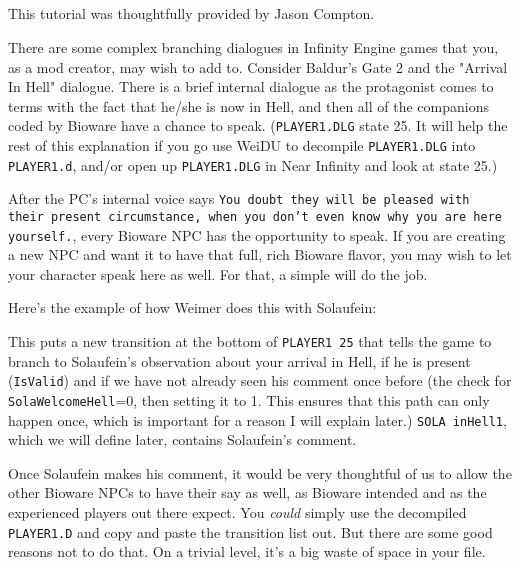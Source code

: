 \documentclass{article}
\def\ttref#1{\ahrefloc{#1}{\tt #1}}
\def\t#1{{\tt #1}}
\begin{document}
\subsection{\ttref{COPY!TRANS}}

This tutorial was thoughtfully provided by Jason Compton. 

There are some complex branching dialogues in Infinity Engine games that
you, as a mod creator, may wish to add to. Consider Baldur's Gate 2 and the
"Arrival In Hell" dialogue. There is a brief internal dialogue as the
protagonist comes to terms with the fact that he/she is now in Hell, and
then all of the companions coded by Bioware have a chance to speak.
(\t{PLAYER1.DLG} state 25. It will help the rest of this explanation if you
go use WeiDU to decompile \t{PLAYER1.DLG} into \t{PLAYER1.d}, and/or open
up \t{PLAYER1.DLG} in Near Infinity and look at state 25.)

After the PC's internal voice says \t{You doubt they will be pleased with
their present circumstance, when you don't even know why you are here
yourself.}, every Bioware NPC has the opportunity to speak. If you are
creating a new NPC and want it to have that full, rich Bioware flavor, you
may wish to let your character speak here as well. For that, a simple
\ttref{EXTEND!BOTTOM} will do the job.

Here's the example of how Weimer does this with Solaufein:
This puts a new transition at the bottom of \t{PLAYER1 25} that tells the
game to branch to Solaufein's observation about your arrival in Hell, if he
is present (\t{IsValid}) and if we have not already seen his comment once
before (the check for \t{SolaWelcomeHell}=0, then setting it to 1. This
ensures that this path can only happen once, which is important for a
reason I will explain later.) \t{SOLA inHell1}, which we will define later,
contains Solaufein's comment.

Once Solaufein makes his comment, it would be very thoughtful of us to
allow the other Bioware NPCs to have their say as well, as Bioware intended
and as the experienced players out there expect. You {\em could} simply use the
decompiled \t{PLAYER1.D} and copy and paste the transition list out. But
there are some good reasons not to do that. On a trivial level, it's a big
waste of space in your \ttref{D} file.
\end{document}
